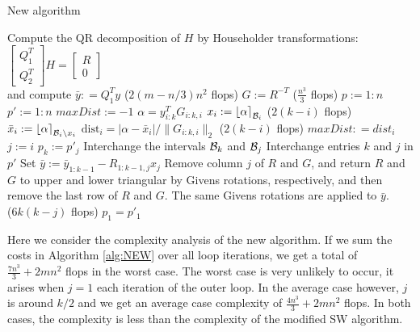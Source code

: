\documentclass[12pt,Bold,letterpaper]{mcgilletdclass}
\newcommand{\bsmx}{\left[\begin{smallmatrix}}
\newcommand{\esmx}{\end{smallmatrix}\right]}
\newcommand{\dist}{\mathrm{dist}}
\begin{document}
\begin{algorithm}
\caption{New algorithm}
\label{alg:NEW}
\begin{algorithmic}[1]
\STATE  Compute the QR decomposition of $H$ by Householder transformations: 
$\bsmx Q_1^T \\ Q_2^T \esmx H= \bsmx R\\ 0 \esmx$  \\
             and compute  $\bar{y} : = Q_1^Ty$ \hfill ($2(m-n/3)n^2$ flops)
\STATE $G := R^{-T}$ \hfill ($\frac{n^3}{3}$ flops)
\STATE $p := 1:n$
\STATE $p' := 1:n$
	\STATE $maxDist := -1$
	         \STATE $\alpha=y_{i:k}^TG_{i:k,i}$
	         \STATE $x_i := \left \lfloor \alpha \right \rceil_{{\cal B}_i}$ \hfill ($2(k-i)$ flops)
	         \STATE $\bar{x}_i := \left \lfloor \alpha \right \rceil_{{{\cal B}_i}\backslash x_i}$
	         \STATE $\dist_i =|\alpha-\bar{x}_i|/ \| G_{i:k,i} \|_2$ \hfill ($2(k-i)$ flops)
			 	\STATE $maxDist : = dist_i$
			 	\STATE $j:=i$
			 \ENDIF	
	\ENDFOR
	\STATE $p_k := p'_j$
	\STATE Interchange the intervals ${{\cal B}_k}$ and ${{\cal B}_j}$
	\STATE Interchange entries $k$ and $j$ in $p'$
	\STATE Set $\bar{y}:=\bar{y}_{1:k-1} - R_{1:k-1,j}x_j$	
	\STATE Remove column $j$ of $R$ and $G$, and return $R$ and $G$ to upper and lower triangular by Givens rotations, respectively, and then remove the last row of $R$ and $G$. The same Givens rotations are applied to $\bar{y}$. \\ \hfill ($6k(k-j)$ flops)
\ENDFOR
\STATE $p_1 = p'_1$
\end{algorithmic}
\end{algorithm}

Here we consider the complexity analysis of the new algorithm. 
If we sum the costs in Algorithm \ref{alg:NEW} over all loop iterations,
we get a total of $\frac{7n^3}{3} + 2mn^2$ flops in the worst case. 
The worst case is very unlikely to occur, it arises when $j=1$ each iteration of the outer loop. In the average case
however, $j$ is around $k/2$ and we get an average case complexity of $\frac{4n^3}{3} + 2mn^2$ flops.
In both cases, the complexity is less than the complexity of the modified SW algorithm.
\end{document}
